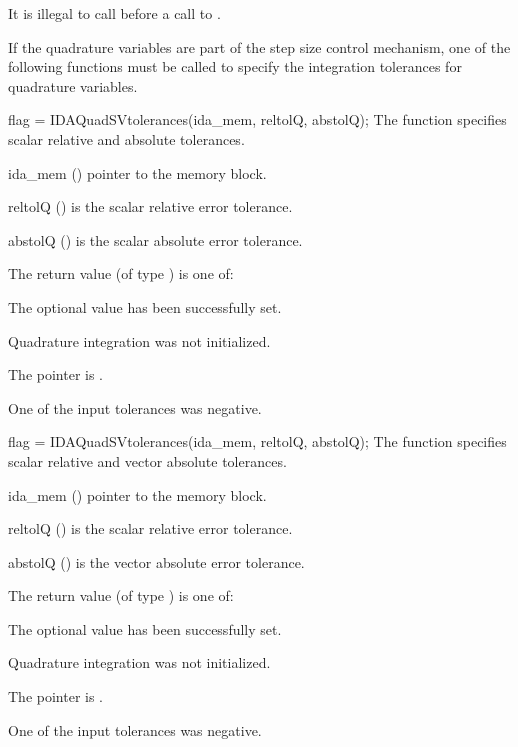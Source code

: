 {{  {\warn}It is illegal to call  before a call
  to .
}


If the quadrature variables are part of the step size control mechanism,
one of the following functions must be called to specify the
integration tolerances for quadrature variables.

{
 flag = IDAQuadSVtolerances(ida\_mem, reltolQ, abstolQ);
}
{
  The function  specifies scalar relative and absolute
  tolerances.
}
{
  \begin{args}
  \item[ida\_mem] ()
    pointer to the {\idas} memory block.
  \item[reltolQ] ()
    is the scalar relative error tolerance.
  \item[abstolQ] ()
    is the scalar absolute error tolerance.
  \end{args}
}
{
  The return value  (of type ) is one of:
  \begin{args}
  \item[\Id{IDA\_SUCCESS}]
    The optional value has been successfully set.
  \item[\Id{IDA\_NO\_QUAD}]
    Quadrature integration was not initialized.
  \item[\Id{IDA\_MEM\_NULL}]
    The  pointer is .
  \item[\Id{IDA\_ILL\_INPUT}]
    One of the input tolerances was negative.
  \end{args}
}
{}

{
 flag = IDAQuadSVtolerances(ida\_mem, reltolQ, abstolQ);
}
{
  The function  specifies scalar relative and
  vector absolute tolerances.
}
{
  \begin{args}
  \item[ida\_mem] ()
    pointer to the {\idas} memory block.
  \item[reltolQ] ()
    is the scalar relative error tolerance.
  \item[abstolQ] ()
    is the vector absolute error tolerance.
  \end{args}
}
{
  The return value  (of type ) is one of:
  \begin{args}
  \item[\Id{IDA\_SUCCESS}]
    The optional value has been successfully set.
  \item[\Id{IDA\_NO\_QUAD}]
    Quadrature integration was not initialized.
  \item[\Id{IDA\_MEM\_NULL}]
    The  pointer is .
  \item[\Id{IDA\_ILL\_INPUT}]
    One of the input tolerances was negative.
  \end{args}
}
{}

}
